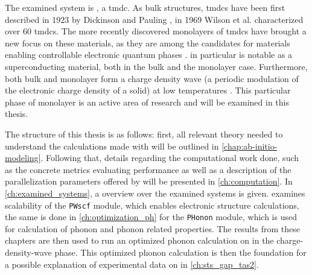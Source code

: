 \documentclass[main.tex]{subfiles}
\begin{document}
The examined system is \TaS, a \acrfull{tmdc}.
As bulk structures, \acrshort{tmdc}s have been first described in 1923 by Dickinson and Pauling \cite{dickinson_crystal_1923}, in 1969 Wilson et al. characterized over 60 \acrshort{tmdc}s.
The more recently discovered monolayers of \acrshort{tmdc}s \cite{novoselov_two-dimensional_2005} have brought a new focus on these materials, as they are among the candidates for materials enabling controllable electronic quantum phases \cite{basov_towards_2017}.
\TaS in particular is notable as a superconducting material, both in the bulk and the monolayer case.
Furthermore, both bulk and monolayer \TaS form a charge density wave (a periodic modulation of the electronic charge density of a solid) at low temperatures \cite{hall_environmental_2019}.
This particular phase of monolayer \TaS is an active area of research and will be examined in this thesis.

The structure of this thesis is as follows:
first, all relevant theory needed to understand the calculations made with \QE will be outlined in \cref{chap:ab-initio-modeling}.
Following that, details regarding the computational work done, such as the concrete metrics evaluating performance as well as a description of the parallelization parameters offered by \QE will be presented in \cref{ch:computation}.
In \cref{ch:examined_systems}, a overview over the examined systems is given.
 examines scalability of the \texttt{PWscf} module, which enables electronic structure calculations, the same is done in \cref{ch:optimization_ph} for the \texttt{PHonon} module, which is used for calculation of phonon and phonon related properties. 
The results from these chapters are then used to run an optimized phonon calculation on \TaS in the charge-density-wave phase.
This optimized phonon calculation is then the foundation for a possible explanation of experimental data on \TaS in \cref{ch:sts_gap_tas2}.
\end{document}
